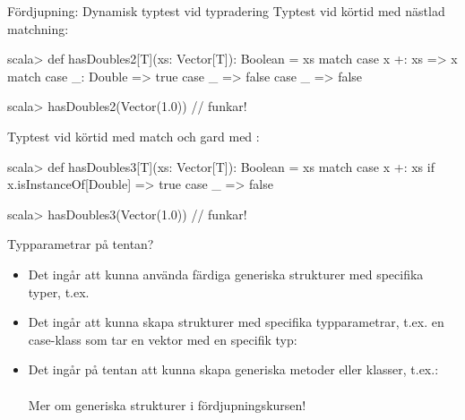 \begin{Slide}{Fördjupning: Dynamisk typtest vid typradering}\SlideFontSmall
Typtest vid körtid med nästlad matchning:
\begin{REPL}
scala> def hasDoubles2[T](xs: Vector[T]): Boolean = xs match {
         case x +: xs => x match {
           case _: Double => true
           case _ => false
         }
         case _ => false
       }

scala> hasDoubles2(Vector(1.0))    // funkar!
\end{REPL}

Typtest vid körtid med match och gard med :
\begin{REPL}

scala> def hasDoubles3[T](xs: Vector[T]): Boolean = xs match {
         case x +: xs if x.isInstanceOf[Double] => true
         case _ => false
       }

scala> hasDoubles3(Vector(1.0))    // funkar!


\end{REPL}
\end{Slide}


\ifkompendium\else

\begin{Slide}{Typparametrar på tentan?}
\begin{itemize}
\item Det ingår att kunna använda färdiga generiska strukturer med specifika typer, t.ex. 

\item Det ingår att kunna skapa strukturer med specifika typparametrar, t.ex. en case-klass som tar en vektor med en specifik typ:\\



\item Det ingår  på tentan att kunna skapa generiska metoder eller klasser, t.ex.: \\
 \\
Mer om generiska strukturer i fördjupningskursen!
\end{itemize}
\end{Slide}

\fi
